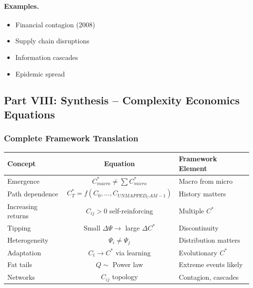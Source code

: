 \paragraph{Examples.}
\begin{itemize}
    \item Financial contagion (2008)
    \item Supply chain disruptions
    \item Information cascades
    \item Epidemic spread
\end{itemize}

\subsection{Part VIII: Synthesis – Complexity Economics Equations}

\subsubsection{Complete Framework Translation}

\begin{center}
\renewcommand{\arraystretch}{1.5}
\begin{tabular}{|l|c|l|}
\hline
\textbf{Concept} & \textbf{Equation} & \textbf{Framework Element} \\
\hline
Emergence & $C^*_{macro} \neq \sum C^*_{micro}$ & Macro from micro \\
\hline
Path dependence & $C^*_T = f(C_0, \ldots, C_{UNMAPPED_CAM-1})$ & History matters \\
\hline
Increasing returns & $C_{ij} > 0$ self-reinforcing & Multiple $C^*$ \\
\hline
Tipping & Small $\Delta\Psi \to$ large $\Delta C^*$ & Discontinuity \\
\hline
Heterogeneity & $\Psi_i \neq \Psi_j$ & Distribution matters \\
\hline
Adaptation & $C_t \to C^*$ via learning & Evolutionary $C^*$ \\
\hline
Fat tails & $Q \sim$ Power law & Extreme events likely \\
\hline
Networks & $C_{ij}$ topology & Contagion, cascades \\
\hline
\end{tabular}
\end{center}

